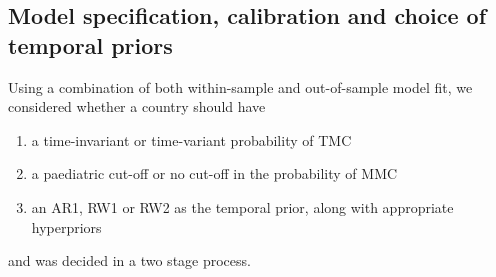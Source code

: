 \documentclass{article}
\begin{document}
\begin{appendix}


\section{Model specification, calibration and choice of temporal priors}
\label{sec::modelcheck}


Using a combination of both within-sample and out-of-sample model fit, we considered whether a country should have
\begin{enumerate}
    \item a time-invariant or time-variant probability of TMC 
    \item a paediatric cut-off or no cut-off in the probability of MMC 
    \item an AR1, RW1 or RW2 as the temporal prior, along with appropriate hyperpriors
\end{enumerate}
and was decided in a two stage process. 


\end{appendix}
\end{document}
